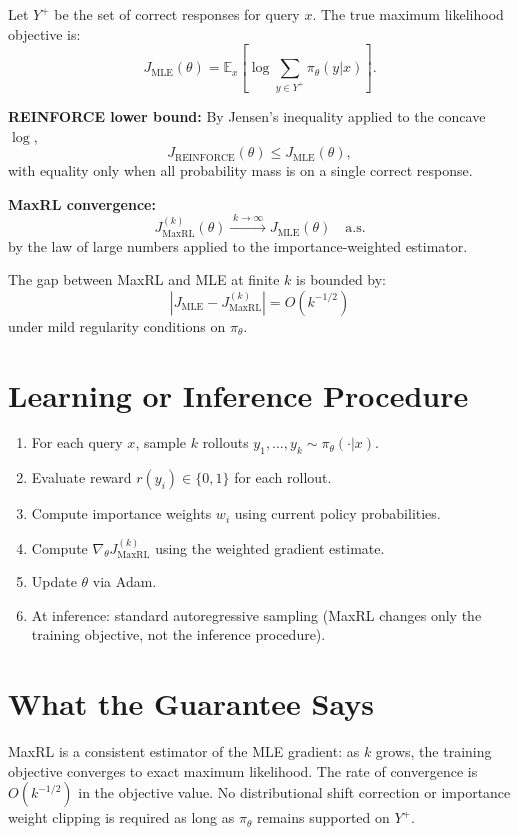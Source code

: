 \documentclass[10pt,twocolumn]{article}
\begin{document}
Let $Y^+$ be the set of correct responses for query $x$. The true
maximum likelihood objective is:
\[
J_\text{MLE}(\theta) = \mathbb{E}_{x}\!\left[\log \sum_{y \in Y^+} \pi_\theta(y|x)\right].
\]

\textbf{REINFORCE lower bound:} By Jensen's inequality applied to the
concave $\log$,
\[
J_\text{REINFORCE}(\theta) \leq J_\text{MLE}(\theta),
\]
with equality only when all probability mass is on a single correct response.

\textbf{MaxRL convergence:}
\[
J_\text{MaxRL}^{(k)}(\theta) \xrightarrow{\;k \to \infty\;} J_\text{MLE}(\theta)
\quad \text{a.s.}
\]
by the law of large numbers applied to the importance-weighted estimator.

The gap between MaxRL and MLE at finite $k$ is bounded by:
\[
|J_\text{MLE} - J_\text{MaxRL}^{(k)}| = O\!\left(k^{-1/2}\right)
\]
under mild regularity conditions on $\pi_\theta$.

\section{Learning or Inference Procedure}

\begin{enumerate}[itemsep=2pt,parsep=0pt]
  \item For each query $x$, sample $k$ rollouts $y_1, \ldots, y_k \sim \pi_\theta(\cdot|x)$.
  \item Evaluate reward $r(y_i) \in \{0,1\}$ for each rollout.
  \item Compute importance weights $w_i$ using current policy probabilities.
  \item Compute $\nabla_\theta J_\text{MaxRL}^{(k)}$ using the weighted
    gradient estimate.
  \item Update $\theta$ via Adam.
  \item At inference: standard autoregressive sampling (MaxRL changes
    only the training objective, not the inference procedure).
\end{enumerate}

\section{What the Guarantee Says}

MaxRL is a consistent estimator of the MLE gradient: as $k$ grows,
the training objective converges to exact maximum likelihood. The rate of
convergence is $O(k^{-1/2})$ in the objective value. No distributional
shift correction or importance weight clipping is required as long as
$\pi_\theta$ remains supported on $Y^+$.
\end{document}
